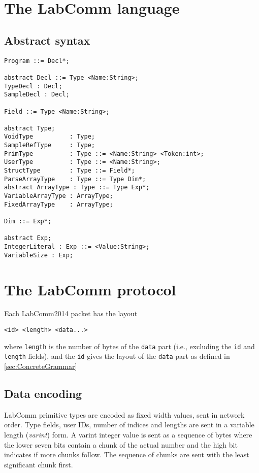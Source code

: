 \documentclass[a4paper]{article}
\begin{document}
{}


\appendix
\newpage

\section{The LabComm language}
\label{sec:LanguageGrammar}

\subsection{Abstract syntax}
\begin{verbatim}
Program ::= Decl*;

abstract Decl ::= Type <Name:String>;
TypeDecl : Decl;
SampleDecl : Decl;

Field ::= Type <Name:String>;

abstract Type;
VoidType          : Type;
SampleRefType     : Type;
PrimType          : Type ::= <Name:String> <Token:int>;
UserType          : Type ::= <Name:String>;
StructType        : Type ::= Field*;
ParseArrayType    : Type ::= Type Dim*;
abstract ArrayType : Type ::= Type Exp*;
VariableArrayType : ArrayType;
FixedArrayType    : ArrayType;

Dim ::= Exp*;

abstract Exp;
IntegerLiteral : Exp ::= <Value:String>;
VariableSize : Exp;
\end{verbatim}

\newpage
\section{The LabComm protocol}
\label{sec:ProtocolGrammar}

Each LabComm2014 packet has the layout
\begin{verbatim}
<id> <length> <data...>
\end{verbatim}
where \verb+length+ is the number of bytes of the \verb+data+ part
(i.e., excluding the \verb+id+ and \verb+length+ fields), and 
the \verb+id+ gives the layout of the \verb+data+ part as defined 
in \ref{sec:ConcreteGrammar}
\subsection{Data encoding}
LabComm primitive types are encoded as fixed width values, sent in
network order.  Type fields, user IDs, number of indices and lengths are
sent in a variable length (\emph{varint}) form.  A varint integer value
is sent as a sequence of bytes where the lower seven bits contain a
chunk of the actual number and the high bit indicates if more chunks
follow. The sequence of chunks are sent with the least significant chunk
first.  
\end{document}
